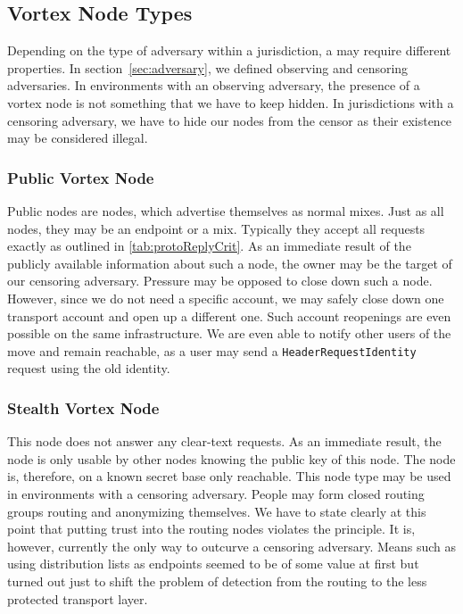 \subsection{Vortex Node Types}\label{sec:vortexNodeTypes}
Depending on the type of adversary within a jurisdiction, a \VortexNode{} may require different properties. In section~\ref{sec:adversary}, we defined observing and censoring adversaries. In environments with an observing adversary, the presence of a vortex node is not something that we have to keep hidden. In jurisdictions with a censoring adversary, we have to hide our nodes from the censor as their existence may be considered illegal.

\subsubsection{Public Vortex Node}
Public nodes are nodes, which advertise themselves as normal mixes. Just as all nodes, they may be an endpoint or a mix. Typically they accept all requests exactly as outlined in \ref{tab:protoReplyCrit}. As an immediate result of the publicly available information about such a node, the owner may be the target of our censoring adversary. Pressure may be opposed to close down such a node. However, since we do not need a specific account, we may safely close down one transport account and open up a different one. Such account reopenings are even possible on the same infrastructure. We are even able to notify other users of the move and remain reachable, as a user may send a \texttt{HeaderRequestIdentity} request using the old identity. 

\subsubsection{Stealth Vortex Node}\label{sec:stealthNode}
This node does not answer any clear-text requests. As an immediate result, the node is only usable by other nodes knowing the public key of this node. The node is, therefore, on a known secret base only reachable. This node type may be used in environments with a censoring adversary. People may form closed routing groups routing and anonymizing themselves. We have to state clearly at this point that putting trust into the routing nodes violates the  principle. It is, however, currently the only way to outcurve a censoring adversary. Means such as using distribution lists as endpoints seemed to be of some value at first but turned out just to shift the problem of detection from the routing to the less protected transport layer.

